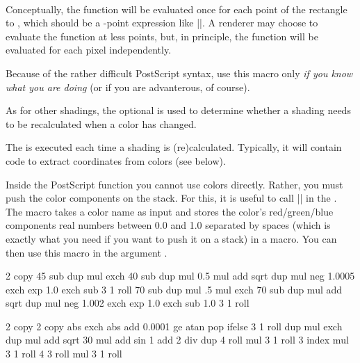 \begin{command}{\pgfdeclarefunctionalshading{}\\
    }
  Conceptually, the function will be evaluated once for each point of
  the rectangle  to ,
  which should be a \pgfname-point expression like
  |\pgfpoint{100bp}{100bp}|. A renderer may choose to evaluate the
  function at less points, but, in principle, the function will be
  evaluated for each pixel independently. 

  Because of the rather difficult PostScript syntax, use this macro
  only \emph{if you know what you are doing} (or if you are
  advanterous, of course). 

  As for other shadings, the optional  is used to
  determine whether a shading needs to be recalculated when a color
  has changed.

  The  is executed each time a shading is
  (re)calculated. Typically, it will contain code to extract
  coordinates from colors (see below).

  Inside the PostScript function  you cannot use
  colors directly. Rather, you must push the color components on the
  stack. For this, it is useful to call |\pgfshadecolorrgb| in the
  . The macro takes a color name as input and stores
  the color's red/green/blue components real numbers between 0.0 and
  1.0 separated by spaces (which is exactly what you need if you want
  to push it on a stack) in a macro. You can then use this macro in
  the argument .

\begin{codeexample}[]
    {\pgfpointorigin}{\pgfpoint{4cm}{4cm}}{}{
  2 copy
  45 sub dup mul exch
  40 sub dup mul 0.5 mul add sqrt
  dup mul neg 1.0005 exch exp 1.0 exch sub
  3 1 roll
  70 sub dup mul .5 mul exch
  70 sub dup mul add sqrt
  dup mul neg 1.002 exch exp 1.0 exch sub
  1.0 3 1 roll
}
\end{codeexample}

\begin{codeexample}[]
{\pgfpoint{1cm}{1cm}}{}{
  2 copy        %
  2 copy abs exch abs add 0.0001 ge { atan } { pop } ifelse
  3 1 roll
  dup mul exch
  dup mul add sqrt
  30 mul
  add
  sin
  1 add 2 div  
  dup
   4 roll      %
  mul
  3 1 roll
  3 index
  mul
  3 1 roll
  4 3 roll
  mul
  3 1 roll
}
%
%
%
\end{codeexample}
\end{command}


